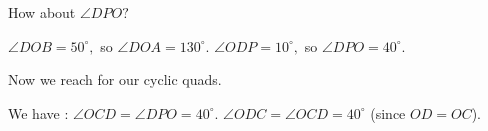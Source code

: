 How about $\angle DPO?$













$\angle DOB=50^\circ,$ so $\angle DOA = 130^\circ.$ $\angle ODP = 10^\circ,$ so $\angle DPO = 40^\circ.$

Now we reach for our cyclic quads.







We have : $\angle OCD = \angle DPO = 40^\circ.$ $\angle ODC = \angle OCD = 40^\circ$ (since $OD = OC$).

